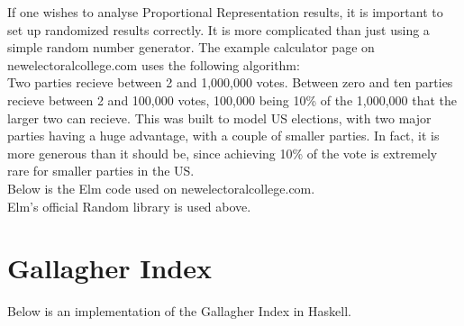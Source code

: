 \documentclass{article}
\begin{document}
    If one wishes to analyse Proportional Representation results, it is important to set up randomized results correctly. It is more complicated than just using a simple random number generator. The example calculator page on newelectoralcollege.com uses the following algorithm: \\

    Two parties recieve between 2 and 1,000,000 votes. Between zero and ten parties recieve between 2 and 100,000 votes, 100,000 being 10\% of the 1,000,000 that the larger two can recieve. This was built to model US elections, with two major parties having a huge advantage, with a couple of smaller parties. In fact, it is more generous than it should be, since achieving 10\% of the vote is extremely rare for smaller parties in the US. \\

    Below is the Elm code used on newelectoralcollege.com. \\

    

    Elm's official Random library is used above.

    \section{Gallagher Index}

    Below is an implementation of the Gallagher Index in Haskell.

    
\end{document}

